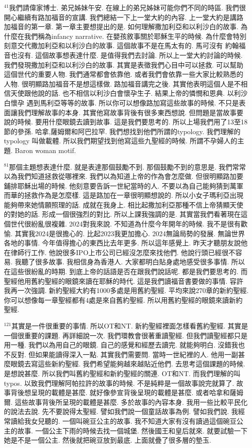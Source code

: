 \documentclass{book}
\begin{document}
$^{41}$我們請偉家博士.
弟兄姊妹午安.
在線上的弟兄姊妹可能你們不同的時區.
我們很開心繼續有路加福音的宣講.
我們總結一下上一堂大約的內容.
上一堂大約是講路加福音的第一章.
第一章主要想提出的是.
如何理解撒加利亞和以利沙白的故事.
為什麼在我們稱為infancy narrative.
在嬰孩敘事關於耶穌生平的時候.
為什麼會特別刻意交代撒加利亞和以利沙白的故事.
這個故事不是在馬太有的.
馬可沒有 約翰福音也沒有.
這個故事想表達什麼.
是值得我們去討論.
所以上一堂大約討論的時候.
我們發現撒加利亞和以利沙白的故事.
其實是表徵我們心目中可以拯救.
可以幫助這個世代的重要人物.
我們通常都會依靠他.
或者我們會依靠一些大家比較熟悉的人物.
很明顯路加福音不是想這樣做.
路加福音講完之後.
其實他表明這個人是不相信天使跟他說的話.
也不相信以利沙白會懷孕生子.
結果上帝的憐憫和恩典.
以利沙白懷孕 遇到馬利亞等等的故事.
所以你可以想像路加寫這些故事的時候.
不只是表面讓我們理解故事的本身.
其實他寫故事背後有很多東西想說.
但問題是當故事要說的時候.
要用什麼眼鏡去讀到故事.
這是我們要思考的.
所以上場我們用了13至18節的參孫.
哈拿,薩姆爾和阿巴拉罕.
我們想找到他們所謂的typology.
我們理解的typology 叫做載體.
所以我們期望找到他寫這些九聖經的時候.
所謂不孕婦人的主題.
Baron woman motif.

$^{81}$那個主題想表達什麼.
就是表達那個鼓勵不到.
那個鼓勵不到的意思是.
我們常常以為我們知道拯救從哪裡來.
我們以為知道上帝的作為會怎麼做.
但很明顯路加要鋪排耶穌出場的時候.
他刻意要告訴一世紀當時的人.
不要以為自己能夠猜到萬軍而華的拯救作為是怎麼樣.
這是路加在一章很明顯想說的.
所以小女子瑪利亞出現能夠帶來她情願照理的話.
成就在我身上.
相比起撒加利亞那種不信上帝猜顯天使的對她的話.
形成一個很強烈的對比.
所以上課我強調的是.
其實當我們看著現在這個世代很紛亂很複雜.
2024對我來說.
不知道為什麼今年開年的時候.
我不是很有歡愉.
其實我2024是很擔心的.
比起2023我更加擔心.
2024無論局勢的發展.
無論世界各地的事情.
今年值得擔心的東西比去年更多.
所以這年感覺上.
昨天才聽朋友說他在律師行工作.
他說很多IPO上市公司已經沒怎麼來找他們.
他說行頭已經很不容易.
我聽了很多故事.
我相信身為香港人.
大家都明白貼身處地感受很多事情.
所以在這些很紛亂的時期.
到底上帝的話語是否在跟我們說話呢.
都是我們要思考的.
而聖經他用舊約聖經的眼鏡來讀在耶穌的時代.
這是我們讀福音書要做的事情.
容許我再一次強調.
新約聖經大約有1000多處是用舊約聖經.
平均來說270章的新約聖經.
你可以想像每一章聖經都有4處是來自舊約聖經.
所以用舊約聖經的眼鏡來讀新約聖經.

$^{121}$其實是一件很重要的事情.
所以OT和NT.
新約聖經裡面怎樣看舊約聖經.
其實是一個很重要的課題.
再詳細說一次.
我們環教會很著重讀聖經.
但我們讀聖經都只是用一種.
我們以為用自己的眼鏡.
自己的感覺和經歷去讀完.
就能夠明白.
沒錯我也不反對.
但如果能讀得深入一點.
其實我們需要問.
當時一世紀裡的人.
他用一副甚麼眼鏡去寫這些新約聖經.
我們希望能夠越來越貼近他們.
去思考這個課題的時候.
是想說甚麼.
所以我們叫舊約聖經和新約聖經的關連.
OT和NT.
而我們理解的叫typos.
以致我們理解阿帕拉許的故事的時候.
不是純粹是一個故事說完就算了.
故事背後想呈現的載體是甚麼.
就好像參宣背後呈現的載體是甚麼.
或者哈拿和薩姆爾.
這些故事背後所呈現的載體是甚麼.
多於故事的內容本身.
我用一些比較平民化的說法去說.
先不要說得太聖經.
譬如我們說一個童話故事為例.
譬如我們說.
我經常讀給我女兒聽的.
一個叫碗豆公主的故事.
我不知道大家有沒有讀過這個碗豆公主的故事.
一個公主下雨的時候去找一個城堡.
然後國王和皇后就來.
就要試驗一下她是不是一個公主.
然後就把碗豆放到最底.
上面就疊了很多層的墊玉.
\end{document}
